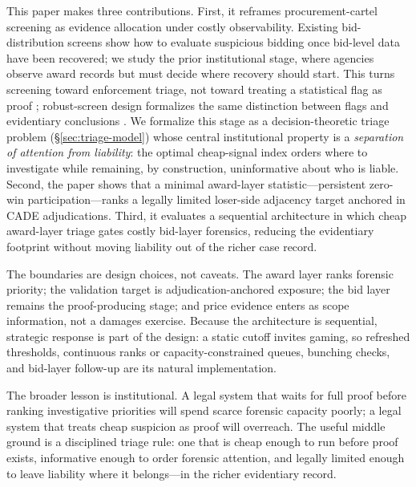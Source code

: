 This paper makes three contributions. First, it reframes
procurement-cartel screening as evidence allocation under costly
observability. Existing bid-distribution screens show how to
evaluate suspicious bidding once bid-level data have been
recovered; we study the prior institutional stage, where
agencies observe award records but must decide where recovery
should start. This turns screening toward enforcement triage,
not toward treating a statistical flag as proof
\citep{harrington2008detecting,sanchezgraells2019screening};
robust-screen design formalizes the same distinction between
flags and evidentiary conclusions \citep{chassang2022robust}. We
formalize this stage as a decision-theoretic triage problem
(\S\ref{sec:triage-model}) whose central institutional property
is a \emph{separation of attention from liability}: the optimal
cheap-signal index orders where to investigate while remaining,
by construction, uninformative about who is liable.
Second, the paper shows that a minimal award-layer
statistic---persistent zero-win participation---ranks a legally
limited loser-side adjacency target anchored in CADE
adjudications. Third, it evaluates a sequential architecture in
which cheap award-layer triage gates costly bid-layer forensics,
reducing the evidentiary footprint without moving liability out
of the richer case record.

The boundaries are design choices, not caveats. The award layer
ranks forensic priority; the validation target is
adjudication-anchored exposure; the bid layer remains the
proof-producing stage; and price evidence enters as scope
information, not a damages exercise. Because the architecture is
sequential, strategic response is part of the design: a static
cutoff invites gaming, so refreshed thresholds, continuous ranks
or capacity-constrained queues, bunching checks, and bid-layer
follow-up are its natural implementation.

The broader lesson is institutional. A legal system that waits
for full proof before ranking investigative priorities will
spend scarce forensic capacity poorly; a legal system that
treats cheap suspicion as proof will overreach. The useful
middle ground is a disciplined triage rule: one that is cheap
enough to run before proof exists, informative enough to order
forensic attention, and legally limited enough to leave
liability where it belongs---in the richer evidentiary record.
